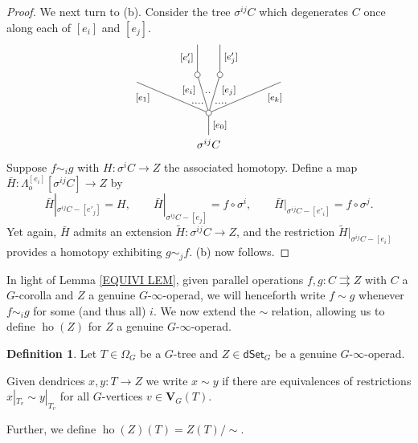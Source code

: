 \documentclass[a4paper,10pt
,draft
]{article}%
\numberwithin{equation}{section}
\numberwithin{figure}{section}
\theoremstyle{definition} %
\newtheorem{definition}[equation]{Definition}%
\newcommand{\1}{\ensuremath{\mathbbm 1}}%
\begin{document}
\begin{proof}
We next turn to (b). Consider the tree $\sigma^{ij} C$ which degenerates $C$ once along each of $[e_i]$ and $[e_j]$.
\[
\begin{tikzpicture}
[grow=up,auto,level distance=2.75em,
every node/.style = {font=\footnotesize},
dummy/.style={circle,draw,inner sep=0pt,minimum size=1.75mm}]
	\node at (0,0) [font=\normalsize]{$\sigma^{ij} C$}
		child{node [dummy] {}
			child{
			edge from parent node [swap,near end] {$[e_k]$} node [near start,inner sep=1pt,name=Kn] {}}
			child[level distance=3.4em,sibling distance=2em]{node [dummy] {}
				child[level distance=2.7em]{
				edge from parent node [swap] {$[e'_j]$}
}
			edge from parent node [very near end,swap] {$[e_j]$}
node [near start,inner sep=1pt,name=Kone,swap] {}
node [inner sep=1pt,name=Kn2] {}}
			child[level distance=3.4em,sibling distance=2em]{node [dummy] {}
				child[level distance=2.7em]{
				edge from parent node {$[e'_i]$}
}
			edge from parent node [very near end] {$[e_i]$}
node [inner sep=1pt,name=Kone2,swap] {}
node [near start,inner sep=1pt,name=Kone1] {}}
			child{
			edge from parent node [near end] {$[e_1]$}
node [swap] {}
node [near start,inner sep=1pt,name=Kn1,swap]{}}
		edge from parent node [swap] {$[e_0]$}
		};
		\draw [dotted,thick] (Kn) -- (Kone) ;
		\draw [dotted,thick] (Kone1) -- (Kn1) ;
		\draw [dotted,thick] (Kone2) -- (Kn2) ;
\end{tikzpicture}
\]
Suppose $f \sim_i g$ with $H \colon \sigma^{i} C \to Z$ the associated homotopy.
Define a map 
$\bar{H} \colon \Lambda^{[e_i]}_o[\sigma^{ij} C] \to Z$ by
\[
	\bar{H}|_{\sigma^{ij}C - [e'_j]} = H,
		\qquad
	\bar{H}|_{\sigma^{ij}C - [e_j]} = f \circ \sigma^i,
		\qquad
	\bar{H}|_{\sigma^{ij}C - [e'_i]} = f \circ \sigma^j.
\]
Yet again, $\bar{H}$ admits an extension $\widetilde{H} \colon \sigma^{ij}C \to Z$, and the restriction $\widetilde{H}|_{\sigma^{ij}C - [e_i]}$
provides a homotopy exhibiting $g \sim_j f$. (b) now follows.
\end{proof}



In light of Lemma \ref{EQUIVI LEM},
given parallel operations $f,g \colon C \rightrightarrows Z$ with 
$C$ a $G$-corolla and $Z$ a genuine $G$-$\infty$-operad,
we will henceforth write $f \sim g$ whenever $f \sim_i g$ for some (and thus all) $i$.
We now extend the $\sim$ relation,
allowing us to define
$\mathop{\mathrm{ho}}(Z)$
for $Z$ a genuine $G$-$\infty$-operad.

\begin{definition}\label{XTENDSIM DEF}
	Let $T \in \Omega_G$ be a $G$-tree
	and $Z \in \mathsf{dSet}_G$ be a 
	genuine $G$-$\infty$-operad.
	
	Given dendrices $x,y\colon T \to Z$ we write
	$x \sim y$ if there are equivalences of restrictions
	$x|_{T_v} \sim y|_{T_v}$ for all $G$-vertices
	$v \in \boldsymbol{V}_G(T)$.
	
	Further, we define $\mathop{\mathrm{ho}}(Z)(T) = Z(T)/\sim$.
\end{definition}
\end{document}

